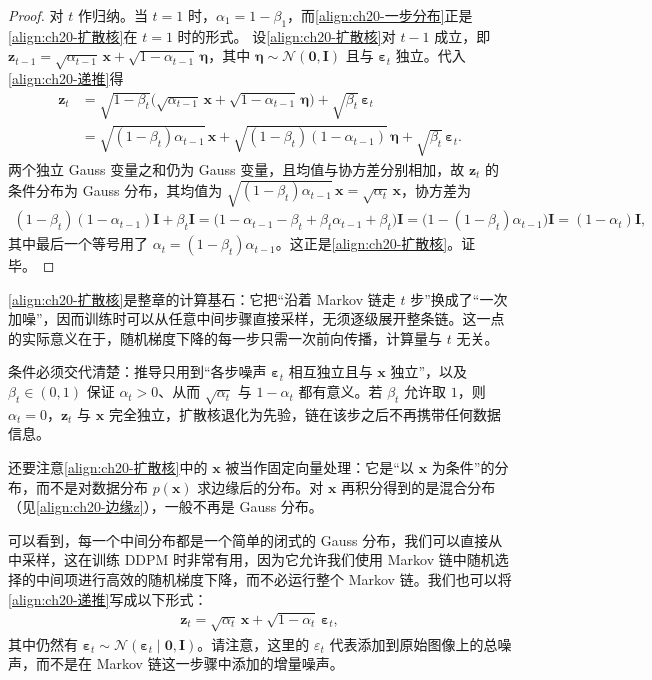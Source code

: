\documentclass[../../main.tex]{subfiles}
\begin{document}
\begin{proof}
对 $t$ 作归纳。当 $t=1$ 时，$\alpha_1=1-\beta_1$，而\eqref{align:ch20-一步分布}正是\eqref{align:ch20-扩散核}在 $t=1$ 时的形式。
设\eqref{align:ch20-扩散核}对 $t-1$ 成立，即 $\bm{z}_{t-1}=\sqrt{\alpha_{t-1}}\,\bm{x}+\sqrt{1-\alpha_{t-1}}\,\bm{\eta}$，其中 $\bm{\eta}\sim\mathcal{N}(\bm{0},\bm{I})$ 且与 $\bm{\varepsilon}_t$ 独立。代入\eqref{align:ch20-递推}得
\begin{align*}
\bm{z}_t&=\sqrt{1-\beta_t}\Big(\sqrt{\alpha_{t-1}}\,\bm{x}+\sqrt{1-\alpha_{t-1}}\,\bm{\eta}\Big)+\sqrt{\beta_t}\,\bm{\varepsilon}_t\\
&=\sqrt{(1-\beta_t)\alpha_{t-1}}\,\bm{x}+\sqrt{(1-\beta_t)(1-\alpha_{t-1})}\,\bm{\eta}+\sqrt{\beta_t}\,\bm{\varepsilon}_t.
\end{align*}
两个独立 Gauss 变量之和仍为 Gauss 变量，且均值与协方差分别相加，故 $\bm{z}_t$ 的条件分布为 Gauss 分布，其均值为 $\sqrt{(1-\beta_t)\alpha_{t-1}}\,\bm{x}=\sqrt{\alpha_t}\,\bm{x}$，协方差为
\begin{align*}
(1-\beta_t)(1-\alpha_{t-1})\bm{I}+\beta_t\bm{I}=\big(1-\alpha_{t-1}-\beta_t+\beta_t\alpha_{t-1}+\beta_t\big)\bm{I}=\big(1-(1-\beta_t)\alpha_{t-1}\big)\bm{I}=(1-\alpha_t)\bm{I},
\end{align*}
其中最后一个等号用了 $\alpha_t=(1-\beta_t)\alpha_{t-1}$。这正是\eqref{align:ch20-扩散核}。证毕。
\end{proof}

\begin{remark}
\eqref{align:ch20-扩散核}是整章的计算基石：它把“沿着 Markov 链走 $t$ 步”换成了“一次加噪”，因而训练时可以从任意中间步骤直接采样，无须逐级展开整条链。这一点的实际意义在于，随机梯度下降的每一步只需一次前向传播，计算量与 $t$ 无关。\par
条件必须交代清楚：推导只用到“各步噪声 $\bm{\varepsilon}_t$ 相互独立且与 $\bm{x}$ 独立”，以及 $\beta_t\in(0,1)$ 保证 $\alpha_t>0$、从而 $\sqrt{\alpha_t}$ 与 $1-\alpha_t$ 都有意义。若 $\beta_t$ 允许取 $1$，则 $\alpha_t=0$，$\bm{z}_t$ 与 $\bm{x}$ 完全独立，扩散核退化为先验，链在该步之后不再携带任何数据信息。\par
还要注意\eqref{align:ch20-扩散核}中的 $\bm{x}$ 被当作固定向量处理：它是“以 $\bm{x}$ 为条件”的分布，而不是对数据分布 $p(\bm{x})$ 求边缘后的分布。对 $\bm{x}$ 再积分得到的是混合分布（见\eqref{align:ch20-边缘z}），一般不再是 Gauss 分布。
\end{remark}

可以看到，每一个中间分布都是一个简单的闭式的 Gauss 分布，我们可以直接从中采样，这在训练 DDPM 时非常有用，因为它允许我们使用 Markov 链中随机选择的中间项进行高效的随机梯度下降，而不必运行整个 Markov 链。我们也可以将\eqref{align:ch20-递推}写成以下形式：
\begin{align}
\bm{z}_t=\sqrt{\alpha_t}\,\bm{x}+\sqrt{1-\alpha_t}\,\bm{\varepsilon}_t,
\label{align:ch20-直接采样}
\end{align}
其中仍然有 $\bm{\varepsilon}_t\sim\mathcal{N}(\bm{\varepsilon}_t\mid\bm{0},\bm{I})$。请注意，这里的 $\varepsilon_t$ 代表添加到原始图像上的总噪声，而不是在 Markov 链这一步骤中添加的增量噪声。
\end{document}
